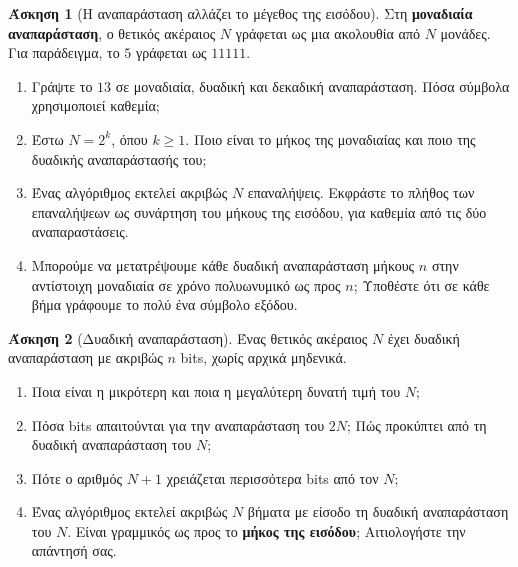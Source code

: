 \documentclass[11pt,a4paper]{article}
\theoremstyle{definition}
\newtheorem{question}{Άσκηση}
\begin{document}
\begin{question}[Η αναπαράσταση αλλάζει το μέγεθος της εισόδου]
Στη \textbf{μοναδιαία αναπαράσταση}, ο θετικός ακέραιος $N$
γράφεται ως μια ακολουθία από $N$ μονάδες.
Για παράδειγμα, το $5$ γράφεται ως $11111$.

\begin{enumerate}
\item Γράψτε το $13$ σε μοναδιαία, δυαδική και δεκαδική
αναπαράσταση. Πόσα σύμβολα χρησιμοποιεί καθεμία;

\item Έστω $N=2^k$, όπου $k\geq 1$.
Ποιο είναι το μήκος της μοναδιαίας και ποιο της δυαδικής
αναπαράστασής του;

\item Ένας αλγόριθμος εκτελεί ακριβώς $N$ επαναλήψεις.
Εκφράστε το πλήθος των επαναλήψεων ως συνάρτηση
του μήκους της εισόδου, για καθεμία από τις δύο αναπαραστάσεις.

\item Μπορούμε να μετατρέψουμε κάθε δυαδική αναπαράσταση
μήκους $n$ στην αντίστοιχη μοναδιαία σε χρόνο πολυωνυμικό
ως προς $n$; Υποθέστε ότι σε κάθε βήμα γράφουμε το πολύ
ένα σύμβολο εξόδου.
\end{enumerate}
\end{question}



\begin{question}[Δυαδική αναπαράσταση]
Ένας θετικός ακέραιος \(N\) έχει δυαδική αναπαράσταση
με ακριβώς \(n\) bits, χωρίς αρχικά μηδενικά.

\begin{enumerate}[label=\textbf{\arabic*.}, itemsep=0.7em]
    \item Ποια είναι η μικρότερη και ποια η μεγαλύτερη
    δυνατή τιμή του \(N\);

    \item Πόσα bits απαιτούνται για την αναπαράσταση του \(2N\);
    Πώς προκύπτει από τη δυαδική αναπαράσταση του \(N\);

    \item Πότε ο αριθμός \(N+1\) χρειάζεται περισσότερα bits
    από τον \(N\);

    \item Ένας αλγόριθμος εκτελεί ακριβώς \(N\) βήματα
    με είσοδο τη δυαδική αναπαράσταση του \(N\).
    Είναι γραμμικός ως προς το \textbf{μήκος της εισόδου};
    Αιτιολογήστε την απάντησή σας.
\end{enumerate}
\end{question}
\end{document}
